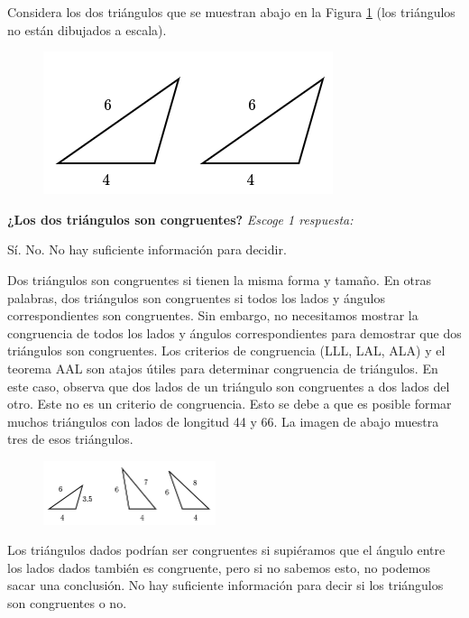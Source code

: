 \question[5] Considera los dos triángulos que se muestran abajo en la Figura \ref{fig:20230323154049} (los triángulos no están dibujados a escala).

\begin{figure}[H]
    \includegraphics[width=0.5\linewidth]{../images/20230323154049}
    \caption{}
    \label{fig:20230323154049}
\end{figure}

\textbf{¿Los dos triángulos son congruentes?}
\emph{Escoge 1 respuesta:}

\begin{choices}
    \choice Sí.
    \choice No.
    \CorrectChoice No hay suficiente información para decidir.
\end{choices}

\begin{solutionbox}{5cm}
    Dos triángulos son congruentes si tienen la misma forma y tamaño. En otras palabras, dos triángulos son congruentes si todos los lados y ángulos correspondientes son congruentes.
    Sin embargo, no necesitamos mostrar la congruencia de todos los lados y ángulos correspondientes para demostrar que dos triángulos son congruentes. Los criterios de congruencia (LLL, LAL, ALA) y el teorema AAL son atajos útiles para determinar congruencia de triángulos.
    En este caso, observa que dos lados de un triángulo son congruentes a dos lados del otro. Este no es un criterio de congruencia.
    Esto se debe a que es posible formar muchos triángulos con lados de longitud 44 y 66. La imagen de abajo muestra tres de esos triángulos.

    \begin{figure}[H]
        \includegraphics[width=0.45\textwidth]{../images/20230323154235}
        \caption{}
        \label{fig:20230323154235}
    \end{figure}

    Los triángulos dados podrían ser congruentes si supiéramos que el ángulo entre los lados dados también es congruente, pero si no sabemos esto, no podemos sacar una conclusión.
    No hay suficiente información para decir si los triángulos son congruentes o no.
\end{solutionbox}